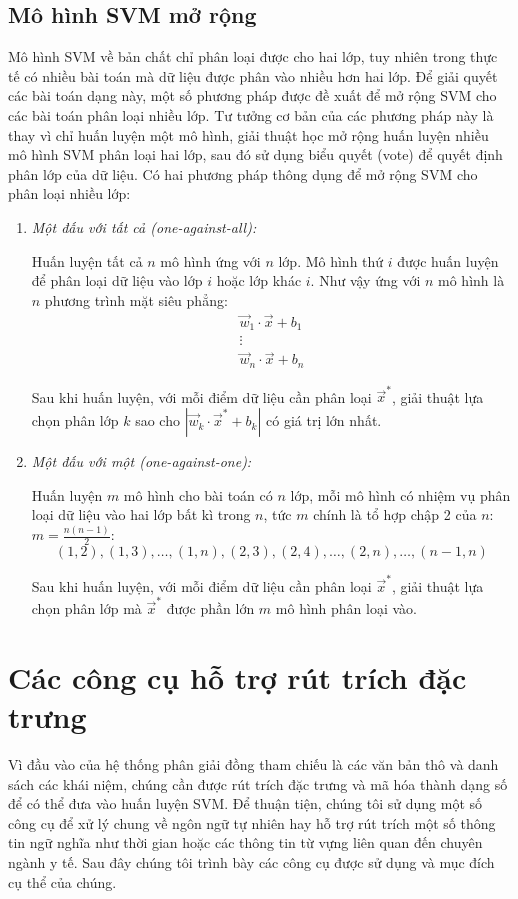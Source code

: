 \subsection*{Mô hình SVM mở rộng}
Mô hình SVM về bản chất chỉ phân loại được cho hai lớp, tuy nhiên trong thực tế có nhiều bài toán mà dữ liệu được phân vào nhiều hơn hai lớp. Để giải quyết các bài toán dạng này, một số phương pháp được đề xuất để mở rộng SVM cho các bài toán phân loại nhiều lớp. Tư tưởng cơ bản của các phương pháp này là thay vì chỉ huấn luyện một mô hình, giải thuật học mở rộng huấn luyện nhiều mô hình SVM phân loại hai lớp, sau đó sử dụng biểu quyết (vote) để quyết định phân lớp của dữ liệu. Có hai phương pháp thông dụng để mở rộng SVM cho phân loại nhiều lớp:
\begin{enumerate}
\item \emph{Một đấu với tất cả (one-against-all):}

Huấn luyện tất cả $n$ mô hình ứng với $n$ lớp. Mô hình thứ $i$ được huấn luyện để phân loại dữ liệu vào lớp $i$ hoặc lớp khác $i$. Như vậy ứng với $n$ mô hình là $n$ phương trình mặt siêu phẳng:
\[
\begin{matrix}
\vec{w}_1\cdot\vec{x}+b_1\\
\vdots\\
\vec{w}_n\cdot\vec{x}+b_n
\end{matrix}
\]

Sau khi huấn luyện, với mỗi điểm dữ liệu cần phân loại $\vec{x}^*$, giải thuật lựa chọn phân lớp $k$ sao cho $|\vec{w}_k\cdot\vec{x}^*+b_k|$ có giá trị lớn nhất.
\item \emph{Một đấu với một (one-against-one):}

Huấn luyện $m$ mô hình cho bài toán có $n$ lớp, mỗi mô hình có nhiệm vụ phân loại dữ liệu vào hai lớp bất kì trong $n$, tức $m$ chính là tổ hợp chập 2 của $n$: $m=\frac{n(n-1)}{2}$:\[(1,2),(1,3),\dots,(1,n),(2,3),(2,4),\dots,(2,n),\dots,(n-1,n)\]

Sau khi huấn luyện, với mỗi điểm dữ liệu cần phân loại $\vec{x}^*$, giải thuật lựa chọn phân lớp mà $\vec{x}^*$ được phần lớn $m$ mô hình phân loại vào.
\end{enumerate}

\section{Các công cụ hỗ trợ rút trích đặc trưng} \label{tools}
Vì đầu vào của hệ thống phân giải đồng tham chiếu là các văn bản thô và danh sách các khái niệm, chúng cần được rút trích đặc trưng và mã hóa thành dạng số để có thể đưa vào huấn luyện SVM. Để thuận tiện, chúng tôi sử dụng một số công cụ để xử lý chung về ngôn ngữ tự nhiên hay hỗ trợ rút trích một số thông tin ngữ nghĩa như thời gian hoặc các thông tin từ vựng liên quan đến chuyên ngành y tế. Sau đây chúng tôi trình bày các công cụ được sử dụng và mục đích cụ thể của chúng.


